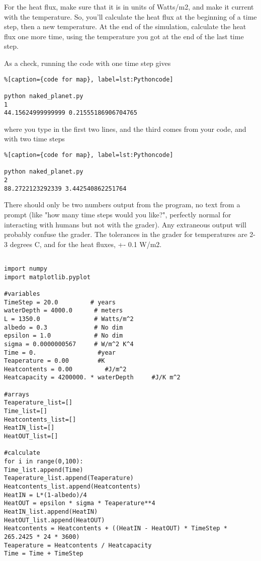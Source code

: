 {For the heat flux, make sure that it is in units of Watts/m2, and make it current with the temperature. So, you'll calculate the heat flux at the beginning of a time step, then a new temperature. At the end of the simulation, calculate the heat flux one more time, using the temperature you got at the end of the last time step.

As a check, running the code with one time step gives

\begin{lstlisting}%[caption={code for map}, label=lst:Pythoncode]

python naked_planet.py
1
44.15624999999999 0.21555186906704765  
\end{lstlisting}

where you type in the first two lines, and the third comes from your code, and with two time steps

\begin{lstlisting}%[caption={code for map}, label=lst:Pythoncode]

python naked_planet.py
2
88.2722123292339 3.442540862251764     
\end{lstlisting}

There should only be two numbers output from the program, no text from a prompt (like "how many time steps would you like?", perfectly normal for interacting with humans but not with the grader). Any extraneous output will probably confuse the grader. The tolerances in the grader for temperatures are 2-3 degrees C, and for the heat fluxes, +- 0.1 W/m2.

\begin{code}[흑체 복사평형 온도]
	\begin{lstlisting}
	
import numpy
import matplotlib.pyplot

#variables
TimeStep = 20.0         # years
waterDepth = 4000.0      # meters
L = 1350.0               # Watts/m^2
albedo = 0.3             # No dim
epsilon = 1.0            # No dim
sigma = 0.0000000567     # W/m^2 K^4
Time = 0.                 #year
Teaperature = 0.00        #K
Heatcontents = 0.00         #J/m^2
Heatcapacity = 4200000. * waterDepth     #J/K m^2

#arrays
Teaperature_list=[]
Time_list=[]
Heatcontents_list=[]
HeatIN_list=[]
HeatOUT_list=[]

#calculate
for i in range(0,100):
Time_list.append(Time)
Teaperature_list.append(Teaperature)
Heatcontents_list.append(Heatcontents)
HeatIN = L*(1-albedo)/4
HeatOUT = epsilon * sigma * Teaperature**4
HeatIN_list.append(HeatIN)
HeatOUT_list.append(HeatOUT)
Heatcontents = Heatcontents + ((HeatIN - HeatOUT) * TimeStep * 265.2425 * 24 * 3600)
Teaperature = Heatcontents / Heatcapacity
Time = Time + TimeStep


\end{lstlisting}
\end{code}}
